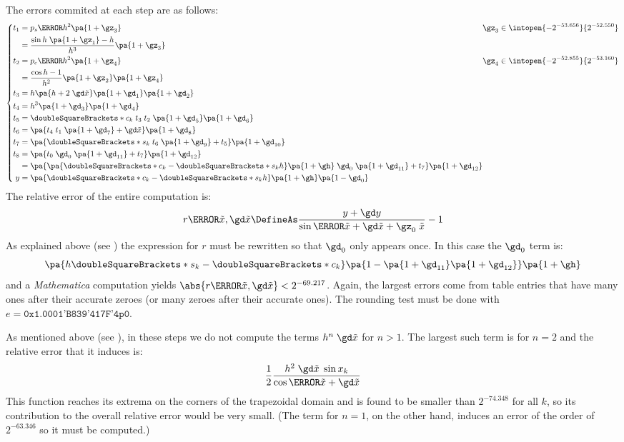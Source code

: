 \documentclass[10pt, a4paper, twoside]{basestyle}
\newcommand{\round}[1]{\doubleSquareBrackets*{#1}}
\newcommand{\red}[1]{\tilde{#1}}
\begin{document}
The errors commited at each step are as follows:
\[
\left\{
\begin{alignedat}{2}
t_1 &= p_s\of{h^2} \pa{1 + \gz_3} \qquad & \gz_3 \in \intopen{-2^{-53.656}}{2^{-52.550}} \\
&= \frac{\sin h \; \pa{1 + \gz_1} - h}{h^3} \pa{1 + \gz_3} \\
t_2 &= p_c\of{h^2} \pa{1 + \gz_4} \qquad & \gz_4 \in \intopen{-2^{-52.855}}{2^{-53.160}} \\
&= \frac{\cos h - 1}{h^2} \pa{1 + \gz_2} \pa{1 + \gz_4} \\
t_3 &= h \pa{h + 2 \; \gd \red x} \pa{1 + \gd_1} \pa{1 + \gd_2} \\
t_4 &= h^3 \pa{1 + \gd_3} \pa{1 + \gd_4} \\
t_5 &= \round{c_k} \; t_3 \; t_2 \; \pa{1 + \gd_5} \pa{1 + \gd_6} \\
t_6 &= \pa{t_4 \; t_1 \; \pa{1 + \gd_7} + \gd \red x} \pa{1 + \gd_8} \\
t_7 &= \pa{\round{s_k} \; t_6 \; \pa{1 + \gd_9} + t_5} \pa{1 + \gd_{10}} \\
t_8 &= \pa{t_0 \; \gd_0 \; \pa{1 + \gd_{11}} + t_7} \pa{1 + \gd_{12}} \\
&= \pa{\pa{\round{c_k} - \round{s_k} h} \pa{1 + \gh} \; \gd_0 \; \pa{1 + \gd_{11}} + t_7} \pa{1 + \gd_{12}} \\
y &= \pa{\round{c_k} - \round{s_k} h} \pa{1 + \gh} \pa{1 - \gd_0}
\end{alignedat}
\right.
\]
The relative error of the entire computation is:
\[
r\of{\red x, \gd \red x} \DefineAs \frac{y + \gd y}{\sin\of{\red x + \gd \red x + \gz_0 \; \red x}} - 1
\]
As explained above (see ) the expression for $r$ must be rewritten so that $\gd_0$ only appears once.  In this case the $\gd_0$ term is:
\[
\pa{h \round{s_k} - \round{c_k}} \pa{1 - \pa{1 + \gd_{11}} \pa{1 + \gd_{12}}} \pa{1 + \gh}
\]
and a \textit{Mathematica} computation yields $\abs{r\of{\red x, \gd \red x}} < 2^{-69.217}$.  Again, the largest errors come from table entries that have many ones after their accurate zeroes (or many zeroes after their accurate ones).  The rounding test must be done with $e = \texttt{0x1.0001'B839'417F'4p0}$.

As mentioned above (see ), in these steps we do not compute the terms $h^n \; \gd \red x$ for $n > 1$.  The largest such term is for $n = 2$ and the relative error that it induces is:
\[
\frac{1}{2}\frac{h^2 \; \gd \red x \; \sin x_k}{\cos\of{\red x + \gd \red x}}
\]
This function reaches its extrema on the corners of the trapezoidal domain and is found to be smaller than $2^{-74.348}$ for all $k$, so its contribution to the overall relative error would be very small.  (The term for $n = 1$, on the other hand, induces an error of the order of $2^{-63.346}$ so it must be computed.)
\end{document}
